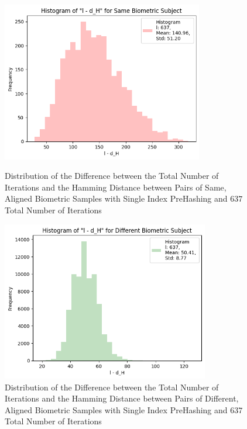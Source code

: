 \begin{enumerate}
\begin{itemize}
            \begin{figure}[H]
                \centering
                \begin{minipage}[b]{0.48\linewidth}
                    \centering
                    \includegraphics[width=\linewidth,height=7cm,keepaspectratio]{latex-img/l-dHconfig1_same.png}
                    \caption{Distribution of the Difference between the Total Number of Iterations and the Hamming Distance between Pairs of Same, Aligned Biometric Samples with Single Index PreHashing and $637$ Total Number of Iterations}
                    \label{l-dHconfig1_same}
                \end{minipage}
                \hfill
                \begin{minipage}[b]{0.48\linewidth}
                    \centering
                    \includegraphics[width=\linewidth,height=7cm,keepaspectratio]{latex-img/l-dHconfig1_diff.png}
                    \caption{Distribution of the Difference between the Total Number of Iterations and the Hamming Distance between Pairs of Different, Aligned Biometric Samples with Single Index PreHashing and $637$ Total Number of Iterations}
                    \label{l-dHconfig1_diff}
                \end{minipage}
            \end{figure}


\end{itemize}
\end{enumerate}
